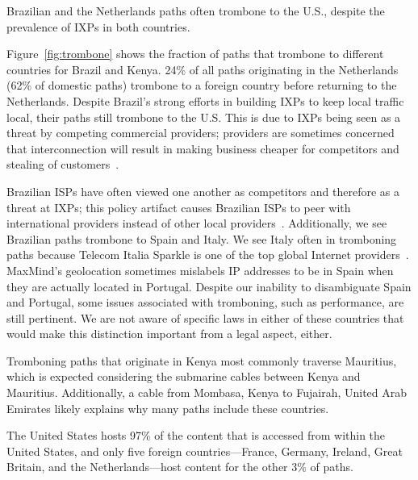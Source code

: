 \begin{finding}
Brazilian and the Netherlands paths often trombone to the U.S., despite the prevalence of IXPs in both countries.
\end{finding}
\noindent
Figure~\ref{fig:trombone}
shows the fraction of paths that trombone to
different countries for Brazil and Kenya. 24\% of
all paths originating in the Netherlands (62\% of domestic paths)
trombone to a foreign country before returning to the
Netherlands. Despite Brazil's strong efforts in building IXPs to keep
local traffic local, 
their paths still trombone to the U.S.  This is due to IXPs being seen
as a threat by competing commercial providers; providers are sometimes
concerned that interconnection will result in making business
cheaper for competitors and stealing of customers~\cite{ixp_policy}.

Brazilian ISPs have often viewed one another as competitors and therefore
as a
threat at IXPs; this policy artifact causes Brazilian ISPs to peer with international
providers instead
of other local providers~\cite{ixp_policy}.  Additionally, we see Brazilian paths trombone to
Spain and Italy.  We see Italy often in tromboning paths because Telecom
Italia Sparkle is one of the top global Internet providers~\cite{bakers}. 
MaxMind's geolocation sometimes mislabels IP addresses to be in
Spain when they are actually located in Portugal.  Despite our inability to
disambiguate Spain and Portugal, some issues associated with tromboning,
such as performance, are still pertinent. We are not aware of specific laws in
either of these countries that would make this distinction important from a legal aspect, either.

Tromboning paths that originate in Kenya most commonly traverse Mauritius,
which is expected considering the submarine cables between Kenya and
Mauritius.  Additionally, a cable from Mombasa,
Kenya to Fujairah, United Arab Emirates likely explains why many
paths include these countries. 


\begin{finding}
The United States hosts 97\% of the content that is accessed from within the United States, and only five foreign countries---France, Germany, Ireland, Great Britain, and the Netherlands---host content for the other 3\% of paths.
\end{finding}
\noindent

